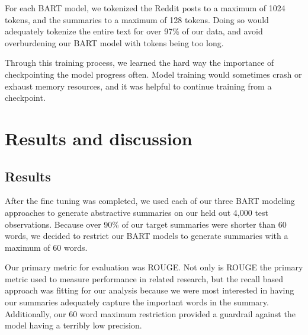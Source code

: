 \documentclass[11pt,a4paper, twocolumn]{article}
\begin{document}
For each BART model, we tokenized the Reddit posts to a maximum of 1024 tokens, and the summaries to a maximum of 128 tokens. 
Doing so would adequately tokenize the entire text for over 97\% of our data, and avoid overburdening our BART model with tokens being too long. 

Through this training process, we learned the hard way the importance of checkpointing the model progress often. 
Model training would sometimes crash or exhaust memory resources, and it was helpful to continue training from a checkpoint. 

\section{Results and discussion}

\subsection{Results}

After the fine tuning was completed, we used each of our three BART modeling approaches to generate abstractive summaries on 
our held out 4,000 test observations. Because over 90\% of our target summaries were shorter than 60 words, we decided to 
restrict our BART models to generate summaries with a maximum of 60 words. 

Our primary metric for evaluation was ROUGE. 
Not only is ROUGE the primary metric used to measure performance in related research, 
but the recall based approach was fitting for our analysis because we were most interested in having our summaries adequately capture the important words in the summary. 
Additionally, our 60 word maximum restriction provided a guardrail against the model having a terribly low precision.
\end{document}
